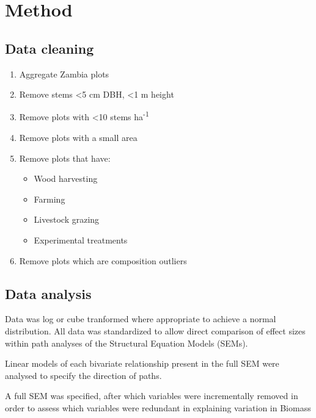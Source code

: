 \documentclass{article}
\begin{document}
\section{Method}

\subsection{Data cleaning}

\begin{enumerate}
	\item{Aggregate Zambia plots}
	\item{Remove stems \textless 5 cm DBH, \textless 1 m height}
	\item{Remove plots with \textless 10 stems ha\textsuperscript{-1}}
	\item{Remove plots with a small area}
	\item{Remove plots that have:}
		\begin{itemize}
			\item{Wood harvesting}
			\item{Farming}
			\item{Livestock grazing}
			\item{Experimental treatments}
		\end{itemize}
	\item{Remove plots which are composition outliers}
\end{enumerate}

\subsection{Data analysis}

Data was log or cube tranformed where appropriate to achieve a normal distribution. All data was standardized to allow direct comparison of effect sizes within path analyses of the Structural Equation Models (SEMs).

Linear models of each bivariate relationship present in the full SEM were analysed to specify the direction of paths. 

A full SEM was specified, after which variables were incrementally removed in order to assess which variables were redundant in explaining variation in Biomass
\end{document}
